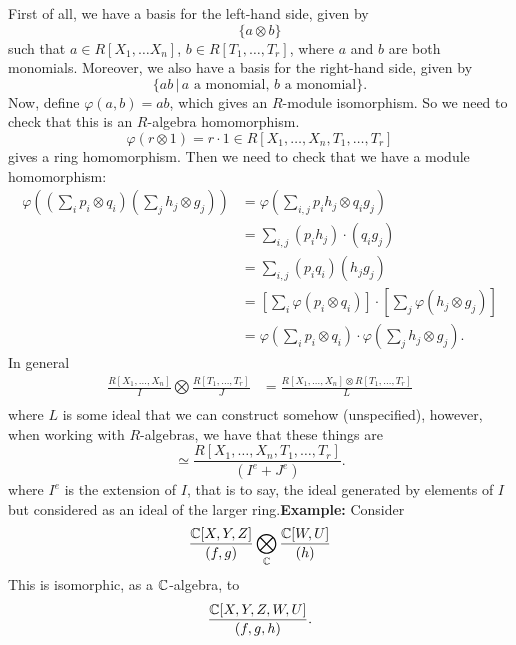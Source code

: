\documentclass{article}
\begin{document}
\proof First of all, we have a basis for the left-hand side, given by \[ \{a \otimes b \}\] such that $a \in R[X_{1}, \dots X_{n}]$, $b \in R[T_{1}, \dots, T_{r}]$, where $a$ and $b$ are both monomials. \gap Moreover, we also have a basis for the right-hand side, given by \[ \{ ab \, | \, a \text{ a monomial}, \, b \text{ a monomial} \}.\] Now, define $\varphi(a,b)=ab$, which gives an $R$-module isomorphism. So we need to check that this is an $R$-algebra homomorphism. \[ \varphi(r \otimes 1) = r\cdot 1 \in R[X_{1}, \dots, X_{n},T_{1},\dots,T_{r}] \] gives a ring homomorphism. Then we need to check that we have a module homomorphism: \begin{align*}
    \varphi\left((\sum_{i} p_{i}\otimes q_{i})(\sum_{j}h_{j}\otimes g_{j})\right) &= \varphi \left( \sum_{i,j} p_{i}h_{j} \otimes q_{i}g_{j} \right)\\ &= \sum_{i,j} (p_{i}h_{j}) \cdot (q_{i}g_{j})\\
    &= \sum_{i,j}(p_{i}q_{i})(h_{j}g_{j})\\
    &= \left[ \sum_{i} \varphi(p_{i} \otimes q_{i}) \right] \cdot \left[ \sum_{j} \varphi(h_{j} \otimes g_{j}) \right]\\
    &= \varphi\left( \sum_{i} p_{i} \otimes q_{i} \right) \cdot \varphi \left( \sum_{j} h_{j} \otimes g_{j} \right).
\end{align*}
In general \begin{align*}
    \frac{R[X_{1}, \dots, X_{n}]}{I} \bigotimes \frac{R[T_{1}, \dots, T_{r}]}{J} & = \frac{R[X_{1}, \dots, X_{n}] \otimes R[T_{1}, \dots, T_{r}]}{L}\\
\end{align*}
where $L$ is some ideal that we can construct somehow (unspecified), however, when working with $R$-algebras, we have that these things are \[ \simeq \frac{R[X_{1},\dots,X_{n},T_{1},\dots,T_{r}]}{(I^{e} + J^{e})}.\] where $I^{e}$ is the extension of $I$, that is to say, the ideal generated by elements of $I$ but considered as an ideal of the larger ring.\gap \textbf{Example:} Consider \[ \frac{\mathbb{C}[X,Y,Z]}{(f,g)} \bigotimes_{\mathbb{C}} \frac{\mathbb{C}[W,U]}{(h)}\]
This is isomorphic, as a $\mathbb{C}$-algebra, to \[ \frac{\mathbb{C}[X,Y,Z,W,U]}{(f,g,h)}.\]
\end{document}
